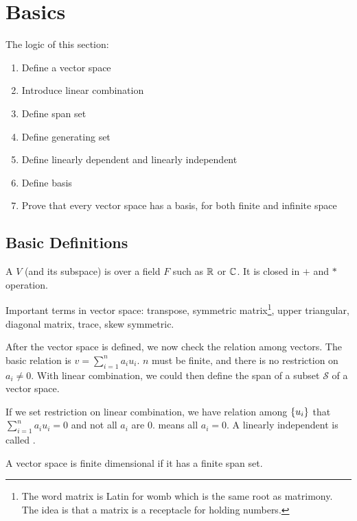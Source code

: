 \chapter{Basics}

The logic of this section:
\begin{enumerate}
    \item Define a vector space
    \item Introduce linear combination
    \item Define span set
    \item Define generating set
    \item Define linearly dependent and linearly independent
    \item Define basis
    \item Prove that every vector space has a basis, for both finite and infinite space
\end{enumerate}

\section{Basic Definitions}

\begin{definition}
    A  $V$ (and its subspace) is over a field $F$ such as $\mathbb{R}$ or $\mathbb{C}$. It is closed in $+$ and $*$ operation.
\end{definition}




Important terms in vector space: transpose, symmetric matrix\footnote{The word matrix is Latin for womb which is the same root as matrimony. The idea is that a matrix is a receptacle for holding numbers.}, upper triangular, diagonal matrix, trace, skew symmetric.

After the vector space is defined, we now check the relation among vectors. The basic relation is  $v = \sum_{i=1}^{n} a_i u_i$. $n$ must be finite, and there is no restriction on $a_i \neq 0$. With linear combination, we could then define the span of a subset $\mathcal{S}$ of a vector space. 

If we set restriction on linear combination, we have  relation among $\set{u_i}$ that $\sum_{i=1}^{n} a_i u_i = 0$ and not all $a_i$ are $0$.  means all $a_i = 0$. A linearly independent  is called .


A vector space is finite dimensional if it has a finite span set.



